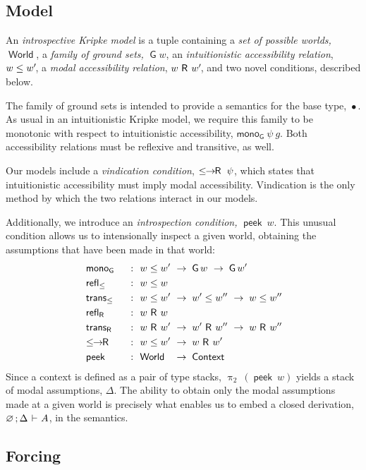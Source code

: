\documentclass[submission,copyright,creativecommons,sharealike,backref=page]{eptcs}
\newcommand{\R}{\mathrel{\rlap{$\mkern.75mu\textsf{R}$}\hphantom{\subseteq}}}
\newcommand{\Rs}{\mathrel{\textsf{R}}}
\renewcommand{\:}{\mathop{\mkern3mu:\mkern3mu}}
\renewcommand{\.}{\mathop{\mkern3mu.\mkern3mu}}
\renewcommand{\;}{\mathop{;}}
\renewcommand{\,}{\mathop{,}}
\newcommand{\e}{\mathrel{\mkern2mu\vdash\mkern1mu}}
\renewcommand{\r}{\mathrel{\rightarrow\mkern-1mu}}
\newcommand{\peek}{\operatorname{\textsf{peek}}}
\newcommand{\piii}{\operatorname{\uppi_{\scriptscriptstyle{2}}}}
\newcommand{\reflle}{\operatorname{\textsf{refl}_{\le}}}
\newcommand{\reflR}{\operatorname{\textsf{refl}_{\Rs}}}
\newcommand{\transle}{\operatorname{\textsf{trans}_{\le}}}
\newcommand{\transR}{\operatorname{\textsf{trans}_{\Rs}}}
\newcommand{\lerR}{\operatorname{\le\mkern-1mu\r\mkern-1mu\R}}
\newcommand{\Context}{\operatorname{\textsf{Context}}}
\newcommand{\World}{\operatorname{\textsf{World}}}
\newcommand{\G}{\operatorname{\textsf{G}}}
\newcommand{\monoG}{\operatorname{\textsf{mono}_{\G}}}
\newcommand{\base}{\mathop{\bullet}}
\renewcommand{\O}{\varnothing}
\theoremstyle{mystyle}
\begin{document}
\subsection{Model}

An \emph{introspective Kripke model} is a tuple containing a \emph{set of possible worlds,} $\World$, a \emph{family of ground sets,} $\G w$, an \emph{intuitionistic accessibility relation}, $w \le w'\mkern-3mu$, a \emph{modal accessibility relation}, $w \R w'\mkern-3mu$, and two novel conditions, described below.

The family of ground sets is intended to provide a semantics for the base type, $\base$.  As usual in an intuitionistic Kripke model, we require this family to be monotonic with respect to intuitionistic accessibility, $\monoG~\psi~g$.  Both accessibility relations must be reflexive and transitive, as well.

Our models include a \emph{vindication condition}, $\lerR~\psi$, which states that intuitionistic accessibility must imply modal accessibility.  Vindication is the only method by which the two relations interact in our models.

Additionally, we introduce an \emph{introspection condition,} $\peek~w$.  This unusual condition allows us to intensionally inspect a given world, obtaining the assumptions that have been made in that world:
\begin{alignat*}{2}
  & \monoG   && ~\:~ w \le w' ~\r~ \G w ~\r~ \G w'\\
  & \reflle  && ~\:~ w \le w\\
  & \transle && ~\:~ w \le w' ~\r~ w' \le w'' ~\r~ w \le w''\\
  & \reflR   && ~\:~ w \R w\\
  & \transR  && ~\:~ w \R w' ~\r~ w' \R w'' ~\r~ w \R w''\\
  & \lerR    && ~\:~ w \le w' ~\r~ w \R w'\\
  & \peek    && ~\:~ \rlap{$\World$}\hphantom{w \le w'} ~\r~ \Context
\end{alignat*}
Since a context is defined as a pair of type stacks, $\piii~(\peek~w)$ yields a stack of modal assumptions, $\Delta$.  The ability to obtain only the modal assumptions made at a given world is precisely what enables us to embed a closed derivation, $\O \; \Delta \e A$, in the semantics.

\subsection{Forcing}
\end{document}
